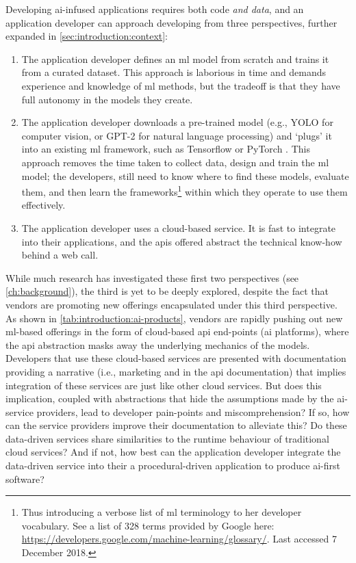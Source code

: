 Developing \gls{ai}-infused applications requires both code \textit{and data}, and an application developer can approach developing from three perspectives, further expanded in \cref{sec:introduction:context}:
\begin{enumerate}
  \item The application developer defines an \gls{ml} model from scratch and trains it from a curated dataset. This approach is laborious in time and demands experience and knowledge of \gls{ml} methods, but the tradeoff is that they have full autonomy in the models they create.
  \item The application developer downloads a pre-trained model (e.g., YOLO \citep{8100173} for computer vision, or GPT-2 \citep{Radford2019} for natural language processing) and `plugs' it into an existing \gls{ml} framework, such as Tensorflow \citep{Abadi:2016vn} or PyTorch \citep{NIPS2019_9015}. This approach removes the time taken to collect data, design and train the \gls{ml} model; the developers, still need to know where to find these models, evaluate them, and then learn the frameworks\footnote{Thus introducing a verbose list of \gls{ml} terminology to her developer vocabulary. See a list of 328 terms provided by Google here: \url{https://developers.google.com/machine-learning/glossary/}. Last accessed 7 December 2018.} within which they operate to use them effectively.
  \item The application developer uses a cloud-based service. It is fast to integrate into their applications, and the \glspl{api} offered abstract the technical know-how behind a web call.
\end{enumerate}
While much research has investigated these first two perspectives (see \cref{ch:background}), the third is yet to be deeply explored, despite the fact that vendors are promoting new offerings encapsulated under this third perspective. As shown in \cref{tab:introduction:ai-products}, vendors are rapidly pushing out new \gls{ml}-based offerings in the form of cloud-based \gls{api} end-points (\gls{ai} platforms), where the \gls{api} abstraction masks away the underlying mechanics of the models. Developers that use these cloud-based services are presented with documentation providing a narrative (i.e., marketing and in the \gls{api} documentation) that implies integration of these services are just like other cloud services. But does this implication, coupled with abstractions that hide the assumptions made by the \gls{ai}-service providers, lead to developer pain-points and miscomprehension?
If so, how can the service providers improve their documentation to alleviate this?
Do these data-driven services share similarities to the runtime behaviour of traditional cloud services?
And if not, how best can the application developer integrate the data-driven service into their a procedural-driven application to produce \gls{ai}-first software?

